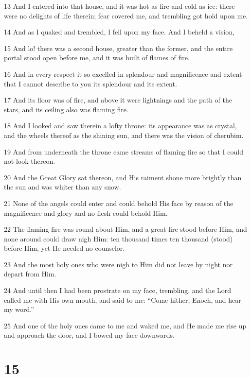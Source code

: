 \par 13 And I entered into that house, and it was hot as fire and cold as ice: there were no delights of life therein; fear covered me, and trembling got hold upon me.
\par 14 And as I quaked and trembled, I fell upon my face. And I beheld a vision,
\par 15 And lo! there was a second house, greater than the former, and the entire portal stood open before me, and it was built of flames of fire.
\par 16 And in every respect it so excelled in splendour and magnificence and extent that I cannot describe to you its splendour and its extent.
\par 17 And its floor was of fire, and above it were lightnings and the path of the stars, and its ceiling also was flaming fire.
\par 18 And I looked and saw therein a lofty throne: its appearance was as crystal, and the wheels thereof as the shining sun, and there was the vision of cherubim.
\par 19 And from underneath the throne came streams of flaming fire so that I could not look thereon.
\par 20 And the Great Glory sat thereon, and His raiment shone more brightly than the sun and was whiter than any snow.
\par 21 None of the angels could enter and could behold His face by reason of the magnificence and glory and no flesh could behold Him.
\par 22 The flaming fire was round about Him, and a great fire stood before Him, and none around could draw nigh Him: ten thousand times ten thousand (stood) before Him, yet He needed no counselor.
\par 23 And the most holy ones who were nigh to Him did not leave by night nor depart from Him.
\par 24 And until then I had been prostrate on my face, trembling, and the Lord called me with His own mouth, and said to me: “Come hither, Enoch, and hear my word.”
\par 25 And one of the holy ones came to me and waked me, and He made me rise up and approach the door, and I bowed my face downwards.

\chapter{15}

